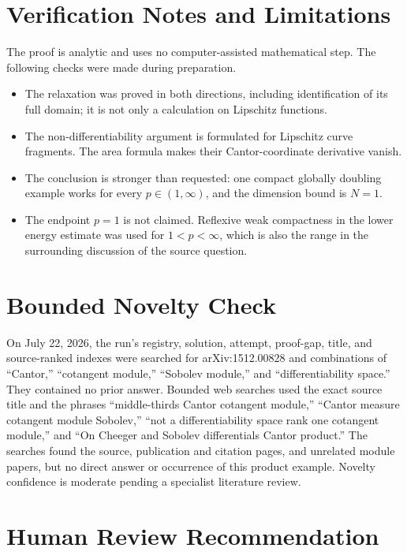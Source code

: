\documentclass[11pt]{article}
\begin{document}
\section*{Verification Notes and Limitations}

The proof is analytic and uses no computer-assisted mathematical step.  The
following checks were made during preparation.
\begin{itemize}
\item The relaxation was proved in both directions, including identification
of its full domain; it is not only a calculation on Lipschitz functions.
\item The non-differentiability argument is formulated for Lipschitz curve
fragments.  The area formula makes their Cantor-coordinate derivative
vanish.
\item The conclusion is stronger than requested: one compact globally
doubling example works for every $p\in(1,\infty)$, and the dimension bound is
$N=1$.
\item The endpoint $p=1$ is not claimed.  Reflexive weak compactness in the
lower energy estimate was used for $1<p<\infty$, which is also the range in
the surrounding discussion of the source question.
\end{itemize}

\section*{Bounded Novelty Check}

On July 22, 2026, the run's registry, solution, attempt, proof-gap, title, and
source-ranked indexes were searched for arXiv:1512.00828 and combinations of
``Cantor,'' ``cotangent module,'' ``Sobolev module,'' and
``differentiability space.''  They contained no prior answer.  Bounded web
searches used the exact source title and the phrases ``middle-thirds Cantor
cotangent module,'' ``Cantor measure cotangent module Sobolev,'' ``not a
differentiability space rank one cotangent module,'' and ``On Cheeger and
Sobolev differentials Cantor product.''  The searches found the source,
publication and citation pages, and unrelated module papers, but no direct
answer or occurrence of this product example.  Novelty confidence is
moderate pending a specialist literature review.

\section*{Human Review Recommendation}
\end{document}

